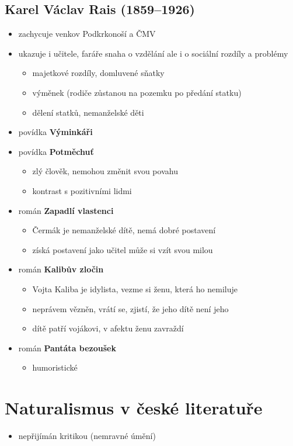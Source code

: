 \subsection{Karel Václav Rais (1859--1926)}
\begin{itemize}
\item zachycuje venkov Podkrkonoší a ČMV
\item ukazuje i učitele, faráře \ra snaha o vzdělání ale i o sociální rozdíly a problémy
	\begin{itemize}
	\item majetkové rozdíly, domluvené sňatky
	\item výměnek (rodiče zůstanou na pozemku po předání statku)
	\item dělení statků, nemanželské děti
	\end{itemize}
\item povídka \textbf{Výminkáři}
\item povídka \textbf{Potměchuť}
	\begin{itemize}
	\item zlý člověk, nemohou změnit svou povahu
	\item kontrast s pozitivními lidmi
	\end{itemize}
\item román \textbf{Zapadlí vlastenci}
	\begin{itemize}
	\item Čermák je nemanželské dítě, nemá dobré postavení
	\item získá postavení jako učitel \ra může si vzít svou milou
	\end{itemize}
\item román \textbf{Kalibův zločin}
	\begin{itemize}
	\item Vojta Kaliba je idylista, vezme si ženu, která ho nemiluje
	\item neprávem vězněn, vrátí se, zjistí, že jeho dítě není jeho
	\item dítě patří vojákovi, v afektu ženu zavraždí
	\end{itemize}
\item román \textbf{Pantáta bezoušek}	
	\begin{itemize}
	\item humoristické
	\end{itemize}
\end{itemize}

\section{Naturalismus v české literatuře}
\begin{itemize}
\item nepřijímán kritikou (nemravné úmění)
\end{itemize}
